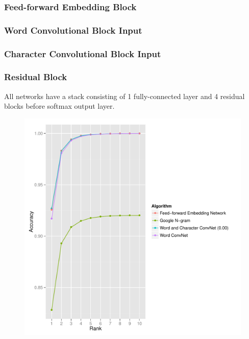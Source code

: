 \begin{frame}
\frametitle{Feed-forward Embedding Block}
\centering
\begin{figure}

\end{figure}
\end{frame}

\begin{frame}
\frametitle{Word Convolutional Block Input}
\centering
\begin{figure}

\end{figure}
\end{frame}

\begin{frame}
\frametitle{Character Convolutional Block Input}
\centering
\begin{figure}

\end{figure}
\end{frame}

\begin{frame}
\frametitle{Residual Block}
All networks have a stack consisting of 1 fully-connected layer and 4 residual blocks before softmax output layer. 
\centering
\begin{figure}

\end{figure}
\end{frame}

\begin{frame}
\begin{figure}
\includegraphics[height=\textheight]{figures/chapter05/accuracy-at-k-binary-contextual}
\end{figure}
\end{frame}


